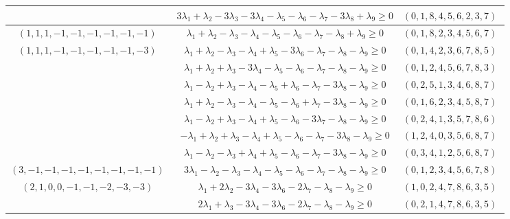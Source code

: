\documentclass[12pt]{article}
\begin{document}
\begin{longtable}[l]{|c|c|c|}
 \cline{2-3} 
 & $3\lambda_{1} + \lambda_{2}-3\lambda_{3}-3\lambda_{4}-\lambda_{5}-\lambda_{6}-\lambda_{7}-3\lambda_{8} + \lambda_{9}\geq 0$ & $(0 ,1 ,8 ,4 ,5 ,6 ,2 ,3 ,7) \;$\\ \hline\multirow{1}{*}{ $(1 ,1 ,1 ,-1 ,-1 ,-1 ,-1 ,-1 ,-1) \;$ }  & $\lambda_{1} + \lambda_{2}-\lambda_{3}-\lambda_{4}-\lambda_{5}-\lambda_{6}-\lambda_{7}-\lambda_{8} + \lambda_{9}\geq 0$ & $(0 ,1 ,8 ,2 ,3 ,4 ,5 ,6 ,7) \;$\\ \hline\multirow{7}{*}{ $(1 ,1 ,1 ,-1 ,-1 ,-1 ,-1 ,-1 ,-3) \;$ }  & $\lambda_{1} + \lambda_{2}-\lambda_{3}-\lambda_{4} + \lambda_{5}-3\lambda_{6}-\lambda_{7}-\lambda_{8}-\lambda_{9}\geq 0$ & $(0 ,1 ,4 ,2 ,3 ,6 ,7 ,8 ,5) \;$\\ 
 \cline{2-3} 
 & $\lambda_{1} + \lambda_{2} + \lambda_{3}-3\lambda_{4}-\lambda_{5}-\lambda_{6}-\lambda_{7}-\lambda_{8}-\lambda_{9}\geq 0$ & $(0 ,1 ,2 ,4 ,5 ,6 ,7 ,8 ,3) \;$\\ 
 \cline{2-3} 
 & $\lambda_{1}-\lambda_{2} + \lambda_{3}-\lambda_{4}-\lambda_{5} + \lambda_{6}-\lambda_{7}-3\lambda_{8}-\lambda_{9}\geq 0$ & $(0 ,2 ,5 ,1 ,3 ,4 ,6 ,8 ,7) \;$\\ 
 \cline{2-3} 
 & $\lambda_{1} + \lambda_{2}-\lambda_{3}-\lambda_{4}-\lambda_{5}-\lambda_{6} + \lambda_{7}-3\lambda_{8}-\lambda_{9}\geq 0$ & $(0 ,1 ,6 ,2 ,3 ,4 ,5 ,8 ,7) \;$\\ 
 \cline{2-3} 
 & $\lambda_{1}-\lambda_{2} + \lambda_{3}-\lambda_{4} + \lambda_{5}-\lambda_{6}-3\lambda_{7}-\lambda_{8}-\lambda_{9}\geq 0$ & $(0 ,2 ,4 ,1 ,3 ,5 ,7 ,8 ,6) \;$\\ 
 \cline{2-3} 
 & $-\lambda_{1} + \lambda_{2} + \lambda_{3}-\lambda_{4} + \lambda_{5}-\lambda_{6}-\lambda_{7}-3\lambda_{8}-\lambda_{9}\geq 0$ & $(1 ,2 ,4 ,0 ,3 ,5 ,6 ,8 ,7) \;$\\ 
 \cline{2-3} 
 & $\lambda_{1}-\lambda_{2}-\lambda_{3} + \lambda_{4} + \lambda_{5}-\lambda_{6}-\lambda_{7}-3\lambda_{8}-\lambda_{9}\geq 0$ & $(0 ,3 ,4 ,1 ,2 ,5 ,6 ,8 ,7) \;$\\ \hline\multirow{1}{*}{ $(3 ,-1 ,-1 ,-1 ,-1 ,-1 ,-1 ,-1 ,-1) \;$ }  & $3\lambda_{1}-\lambda_{2}-\lambda_{3}-\lambda_{4}-\lambda_{5}-\lambda_{6}-\lambda_{7}-\lambda_{8}-\lambda_{9}\geq 0$ & $(0 ,1 ,2 ,3 ,4 ,5 ,6 ,7 ,8) \;$\\ \hline\multirow{11}{*}{ $(2 ,1 ,0 ,0 ,-1 ,-1 ,-2 ,-3 ,-3) \;$ }  & $\lambda_{1} + 2\lambda_{2}-3\lambda_{4}-3\lambda_{6}-2\lambda_{7}-\lambda_{8}-\lambda_{9}\geq 0$ & $(1 ,0 ,2 ,4 ,7 ,8 ,6 ,3 ,5) \;$\\ 
 \cline{2-3} 
 & $2\lambda_{1} + \lambda_{3}-3\lambda_{4}-3\lambda_{6}-2\lambda_{7}-\lambda_{8}-\lambda_{9}\geq 0$ & $(0 ,2 ,1 ,4 ,7 ,8 ,6 ,3 ,5) \;$\\ 

\end{longtable}
\end{document}
